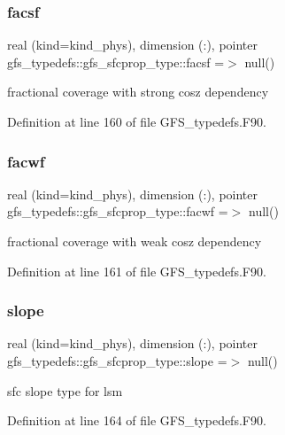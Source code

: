 \subsubsection{facsf}
{\footnotesize\ttfamily real (kind=kind\+\_\+phys), dimension  (\+:), pointer gfs\+\_\+typedefs\+::gfs\+\_\+sfcprop\+\_\+type\+::facsf =$>$ null()}



fractional coverage with strong cosz dependency 



Definition at line 160 of file G\+F\+S\+\_\+typedefs.\+F90.

\mbox{\label{structgfs__typedefs_1_1gfs__sfcprop__type_ade8ff5204e44b8513f75bc6eaa3e68cc}} 
\subsubsection{facwf}
{\footnotesize\ttfamily real (kind=kind\+\_\+phys), dimension  (\+:), pointer gfs\+\_\+typedefs\+::gfs\+\_\+sfcprop\+\_\+type\+::facwf =$>$ null()}



fractional coverage with weak cosz dependency 



Definition at line 161 of file G\+F\+S\+\_\+typedefs.\+F90.

\mbox{\label{structgfs__typedefs_1_1gfs__sfcprop__type_a0864f47ef28e496b248e858f669f40f6}} 
\subsubsection{slope}
{\footnotesize\ttfamily real (kind=kind\+\_\+phys), dimension  (\+:), pointer gfs\+\_\+typedefs\+::gfs\+\_\+sfcprop\+\_\+type\+::slope =$>$ null()}



sfc slope type for lsm 



Definition at line 164 of file G\+F\+S\+\_\+typedefs.\+F90.

\mbox{\label{structgfs__typedefs_1_1gfs__sfcprop__type_a5391c96abfd24fb44c5a091767a90ed2}} 
